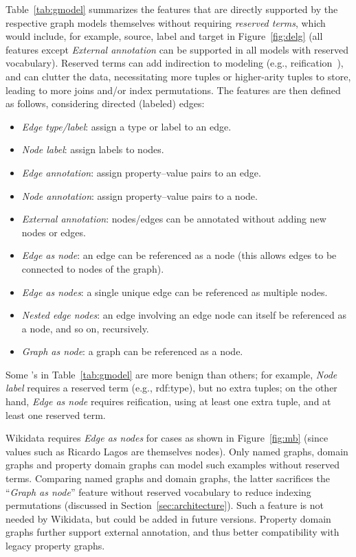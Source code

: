 Table~\ref{tab:gmodel} summarizes the features that are directly supported by the respective graph models themselves without requiring \textit{reserved terms}, which would include, for example, \textsf{source}, \textsf{label} and \textsf{target} in Figure~\ref{fig:delg} (all features except \textit{External annotation} can be supported in all models with reserved vocabulary). Reserved terms can add indirection to modeling (e.g., reification~\cite{HernandezHK15}), and can clutter the data, necessitating more tuples or higher-arity tuples to store, leading to more joins and/or index permutations. The features are then defined as follows, considering directed (labeled) edges:

\begin{itemize}
\item \textit{Edge type/label}: assign a type or label to an edge.
\item \textit{Node label}: assign labels to nodes.
\item \textit{Edge annotation}: assign property--value pairs to an edge.
\item \textit{Node annotation}: assign property--value pairs to a node.
\item \textit{External annotation}: nodes/edges can be annotated without adding new nodes or edges.
\item \textit{Edge as node}: an edge can be referenced as a node (this allows edges to be connected to nodes of the graph).
\item \textit{Edge as nodes}: a single unique edge can be referenced as multiple nodes.
\item \textit{Nested edge nodes}: an edge involving an edge node can itself be referenced as a node, and so on, recursively.
\item \textit{Graph as node}: a graph can be referenced as a node.
\end{itemize}

Some \nmark's in Table~\ref{tab:gmodel} are more benign than others; for example, \textit{Node label} requires a reserved term (e.g., \textsf{rdf:type}), but no extra tuples; on the other hand, \textit{Edge as node} requires reification, using at least one extra tuple, and at least one reserved term.

Wikidata requires \textit{Edge as nodes} for cases as shown in Figure~\ref{fig:mb} (since values such as \textsf{Ricardo Lagos} are themselves nodes). Only named graphs, domain graphs and property domain graphs can model such examples without reserved terms. Comparing named graphs and domain graphs, the latter sacrifices the ``\textit{Graph as node}'' feature without reserved vocabulary to reduce indexing permutations (discussed in Section~\ref{sec:architecture}). Such a feature is not needed by Wikidata, but could be added in future versions. Property domain graphs further support external annotation, and thus better compatibility with legacy property graphs.

